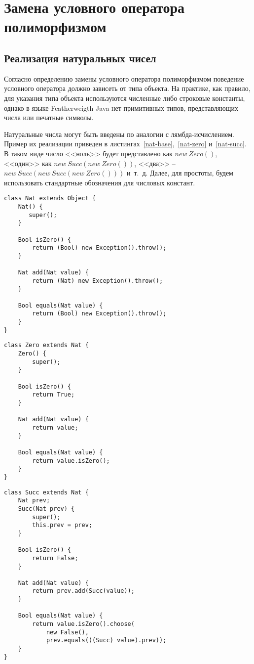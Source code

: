 \section{Замена условного оператора полиморфизмом}
\subsection{Реализация натуральных чисел}
Согласно определению замены условного оператора полиморфизмом поведение условного оператора должно зависеть от типа объекта.
На практике, как правило, для указания типа объекта используются численные либо строковые константы,
однако в языке Featherweigth Java нет примитивных типов, представляющих числа или печатные символы.

Натуральные числа могут быть введены по аналогии с лямбда-исчислением.
Пример их реализации приведен в листингах~\ref{nat-base},~\ref{nat-zero} и~\ref{nat-succ}.
В таком виде число <<ноль>> будет представлено как $new\ Zero()$, <<один>> как $new\ Succ(new\ Zero())$, <<два>> -- $new\ Succ(new\ Succ(new\ Zero()))$ и~т.~д.
Далее, для простоты, будем использовать стандартные обозначения для числовых констант.
\begin{lstlisting}[float,label=nat-base,caption=Определение базового класса натуральных чисел.]
class Nat extends Object {
    Nat() {
       super();
    }

    Bool isZero() {
        return (Bool) new Exception().throw();
    }

    Nat add(Nat value) {
        return (Nat) new Exception().throw();
    }

    Bool equals(Nat value) {
        return (Bool) new Exception().throw();
    }
}
\end{lstlisting}
\begin{lstlisting}[float,label=nat-zero,caption=Определение класса{,} представляющего число ноль.]
class Zero extends Nat {
    Zero() {
        super();
    }

    Bool isZero() {
        return True;
    }

    Nat add(Nat value) {
        return value;
    }

    Bool equals(Nat value) {
        return value.isZero();
    }
}
\end{lstlisting}
\begin{lstlisting}[float,label=nat-succ,caption=Определение класса{,} представляющего натуральное число{,} следующее за указанным.]
class Succ extends Nat {
    Nat prev;
    Succ(Nat prev) {
        super();
        this.prev = prev;
    }

    Bool isZero() {
        return False;
    }

    Nat add(Nat value) {
        return prev.add(Succ(value));
    }

    Bool equals(Nat value) {
        return value.isZero().choose(
            new False(),
            prev.equals(((Succ) value).prev));
    }
}
\end{lstlisting}
